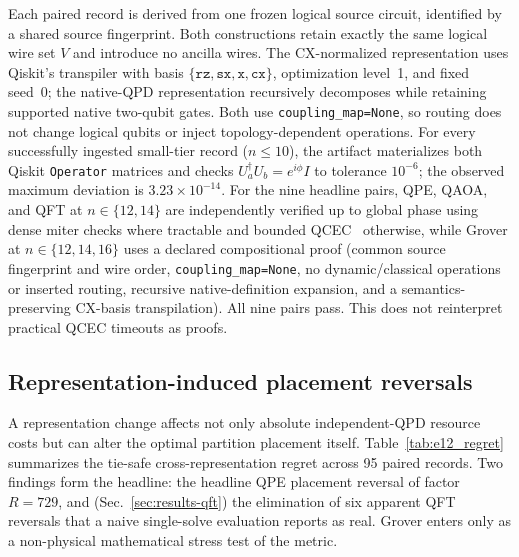 \documentclass[
  aps,
  pra,
  reprint,
  amsmath,
  amssymb,
  longbibliography,
  nofootinbib,
  floatfix
]{revtex4-2}
\theoremstyle{plain}
\begin{document}
Each paired record is derived from one frozen logical source circuit, identified by a shared source fingerprint. Both constructions retain exactly the same logical wire set $V$ and introduce no ancilla wires. The CX-normalized representation uses Qiskit's transpiler with basis $\{\texttt{rz},\texttt{sx},\texttt{x},\texttt{cx}\}$, optimization level~1, and fixed seed~0; the native-QPD representation recursively decomposes while retaining supported native two-qubit gates. Both use \texttt{coupling\_map=None}, so routing does not change logical qubits or inject topology-dependent operations. For every successfully ingested small-tier record ($n\le10$), the artifact materializes both Qiskit \texttt{Operator} matrices and checks $U_a^\dagger U_b=e^{i\phi}I$ to tolerance $10^{-6}$; the observed maximum deviation is $3.23\times10^{-14}$. For the nine headline pairs, QPE, QAOA, and QFT at $n\in\{12,14\}$ are independently verified up to global phase using dense miter checks where tractable and bounded QCEC~\cite{peham2022zx_equivalence} otherwise, while Grover at $n\in\{12,14,16\}$ uses a declared compositional proof (common source fingerprint and wire order, \texttt{coupling\_map=None}, no dynamic/classical operations or inserted routing, recursive native-definition expansion, and a semantics-preserving CX-basis transpilation). All nine pairs pass. This does not reinterpret practical QCEC timeouts as proofs.

\subsection{Representation-induced placement reversals}
\label{sec:results-reversals}

A representation change affects not only absolute independent-QPD resource costs but can alter the optimal partition placement itself. Table~\ref{tab:e12_regret} summarizes the tie-safe cross-representation regret across 95 paired records. Two findings form the headline: the headline QPE placement reversal of factor $R=729$, and (Sec.~\ref{sec:results-qft}) the elimination of six apparent QFT reversals that a naive single-solve evaluation reports as real. Grover enters only as a non-physical mathematical stress test of the metric.
\end{document}
